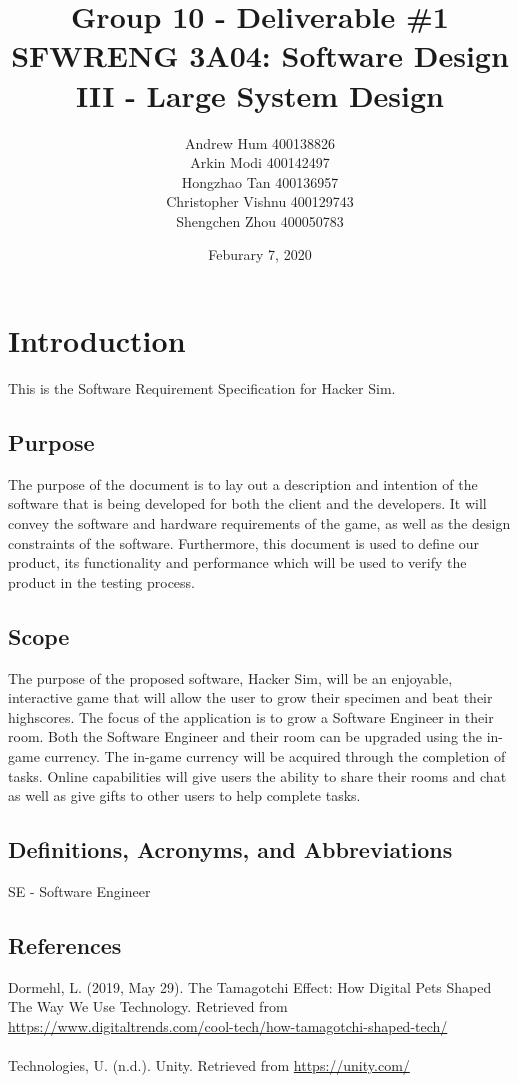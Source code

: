 \documentclass[]{article}
\title{
    \textbf{Group 10 - Deliverable \#1}\\
    \large SFWRENG 3A04: Software Design III - Large System Design
}
\author{
    Andrew Hum 400138826\\
    Arkin Modi 400142497\\
    Hongzhao Tan 400136957\\
    Christopher Vishnu 400129743\\
    Shengchen Zhou 400050783\\
}
\date{Feburary 7, 2020}
\begin{document}
\maketitle	
\newpage

\section{Introduction}
\label{sec:introduction}
This is the Software Requirement Specification for Hacker Sim.

\subsection{Purpose}
\label{sub:purpose}
The purpose of the document is to lay out a description and intention of the 
software that is being developed for both the client and the developers. It 
will convey the software and hardware requirements of the game, as well as the 
design constraints of the software. Furthermore, this document is used to define 
our product, its functionality and performance which will be used to verify the 
product in the testing process. 

\subsection{Scope}
\label{sub:scope}
The purpose of the proposed software, Hacker Sim, will be an enjoyable, 
interactive game that will allow the user to grow their specimen and beat their 
highscores. The focus of the application is to grow a Software Engineer in their 
room. Both the Software Engineer and their room can be upgraded using the 
in-game currency. The in-game currency will be acquired through the completion 
of tasks. Online capabilities will give users the ability to share their rooms 
and chat as well as give gifts to other users to help complete tasks. 


\subsection{Definitions, Acronyms, and Abbreviations}
\label{sub:definitions_acronyms_and_abbreviations}
SE - Software Engineer

\subsection{References}
\label{sub:references}
Dormehl, L. (2019, May 29). The Tamagotchi Effect: How Digital Pets Shaped The 
Way We Use Technology. Retrieved from 
\url{https://www.digitaltrends.com/cool-tech/how-tamagotchi-shaped-tech/}
\\\\
Technologies, U. (n.d.). Unity. Retrieved from \url{https://unity.com/}
\end{document}

